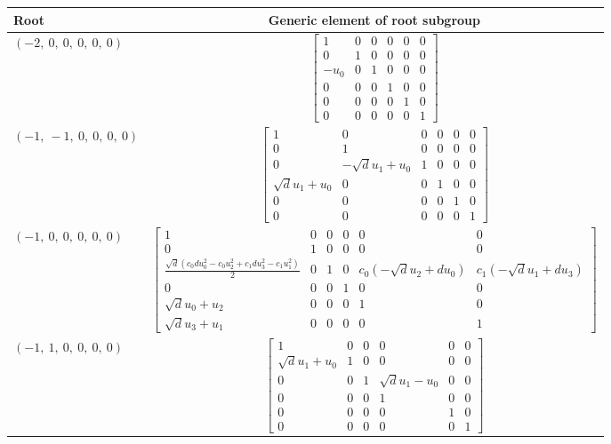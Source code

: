 \documentclass[11pt]{article}
\theoremstyle{definition}
\begin{document}
\noindent \begin{longtable}{|l|c|}
    \hline
    \textbf{Root} & \textbf{Generic element of root subgroup} \\
    \hline
    \endhead
    $\left( -2, \  0, \  0, \  0, \  0, \  0\right)$ & ${\left[\begin{matrix}1 & 0 & 0 & 0 & 0 & 0\\0 & 1 & 0 & 0 & 0 & 0\\- u_{0} & 0 & 1 & 0 & 0 & 0\\0 & 0 & 0 & 1 & 0 & 0\\0 & 0 & 0 & 0 & 1 & 0\\0 & 0 & 0 & 0 & 0 & 1\end{matrix}\right]}$ \\
    \hline
    $\left( -1, \  -1, \  0, \  0, \  0, \  0\right)$ & ${\left[\begin{matrix}1 & 0 & 0 & 0 & 0 & 0\\0 & 1 & 0 & 0 & 0 & 0\\0 & - \sqrt{d} u_{1} + u_{0} & 1 & 0 & 0 & 0\\\sqrt{d} u_{1} + u_{0} & 0 & 0 & 1 & 0 & 0\\0 & 0 & 0 & 0 & 1 & 0\\0 & 0 & 0 & 0 & 0 & 1\end{matrix}\right]}$ \\
    \hline
    $\left( -1, \  0, \  0, \  0, \  0, \  0\right)$ & ${\left[\begin{matrix}1 & 0 & 0 & 0 & 0 & 0\\0 & 1 & 0 & 0 & 0 & 0\\\frac{\sqrt{d} \left(c_{0} d u_{0}^{2} - c_{0} u_{2}^{2} + c_{1} d u_{3}^{2} - c_{1} u_{1}^{2}\right)}{2} & 0 & 1 & 0 & c_{0} \left(- \sqrt{d} u_{2} + d u_{0}\right) & c_{1} \left(- \sqrt{d} u_{1} + d u_{3}\right)\\0 & 0 & 0 & 1 & 0 & 0\\\sqrt{d} u_{0} + u_{2} & 0 & 0 & 0 & 1 & 0\\\sqrt{d} u_{3} + u_{1} & 0 & 0 & 0 & 0 & 1\end{matrix}\right]}$ \\
    \hline
    $\left( -1, \  1, \  0, \  0, \  0, \  0\right)$ & ${\left[\begin{matrix}1 & 0 & 0 & 0 & 0 & 0\\\sqrt{d} u_{1} + u_{0} & 1 & 0 & 0 & 0 & 0\\0 & 0 & 1 & \sqrt{d} u_{1} - u_{0} & 0 & 0\\0 & 0 & 0 & 1 & 0 & 0\\0 & 0 & 0 & 0 & 1 & 0\\0 & 0 & 0 & 0 & 0 & 1\end{matrix}\right]}$ \\

\end{longtable}
\end{document}
